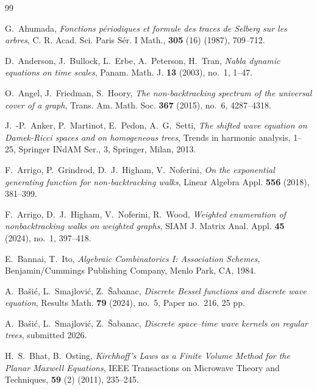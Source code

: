 \documentclass[reqno,10pt]{amsart}
\theoremstyle{definition}
\numberwithin{equation}{section}
\begin{document}
\begin{thebibliography}{99}

 G.~Ahumada, \textit{Fonctions p\'eriodiques et formule des traces de Selberg sur les arbres}, C. R. Acad. Sci. Paris S\'er. I Math., \textbf{305} (16) (1987), 709--712.

 D.~Anderson, J.~Bullock, L.~Erbe, A.~Peterson, H.~Tran, \textit{Nabla dynamic equations on time scales}, Panam. Math. J. \textbf{13} (2003), no.~1, 1--47.

 O.~Angel, J.~Friedman, S.~Hoory, \textit{The non-backtracking spectrum of the universal cover of a graph}, Trans. Am. Math. Soc. \textbf{367} (2015), no.~6, 4287--4318.

 J.~-P.~Anker, P.~Martinot, E.~Pedon, A.~G.~Setti, \textit{
The shifted wave equation on Damek-Ricci spaces and on homogeneous trees}, Trends in harmonic analysis, 1--25, Springer INdAM Ser., 3, Springer, Milan, 2013.

 F.~Arrigo, P.~Grindrod, D.~J.~Higham, V.~Noferini, \textit{On the exponential generating function for non-backtracking walks}, Linear Algebra Appl. \textbf{556} (2018), 381--399.

 F.~Arrigo, D.~J.~Higham, V.~Noferini, R.~Wood, \textit{Weighted enumeration of nonbacktracking walks on weighted graphs}, SIAM J. Matrix Anal. Appl. \textbf{45} (2024), no.~1, 397--418.

E.~Bannai, T.~Ito, \textit{Algebraic Combinatorics I: Association Schemes}, Benjamin/Cummings Publishing Company, Menlo Park, CA, 1984.

 A.~Ba\v{s}i\'{c}, L.~Smajlovi\'{c}, Z.~\v{S}abanac, \textit{Discrete Bessel functions and discrete wave equation}, Results Math. \textbf{79} (2024), no.~5, Paper no.~216, 25 pp.

 A.~Ba\v{s}i\'{c}, L.~Smajlovi\'{c}, Z.~\v{S}abanac, \textit{Discrete space--time wave kernels on regular trees}, submitted 2026.

 H.~S.~Bhat, B.~Osting, \textit{Kirchhoff's Laws as a Finite Volume Method for the Planar Maxwell Equations}, IEEE Transactions on Microwave Theory and Techniques, \textbf{59} (2) (2011), 235--245.



\end{thebibliography}
\end{document}
